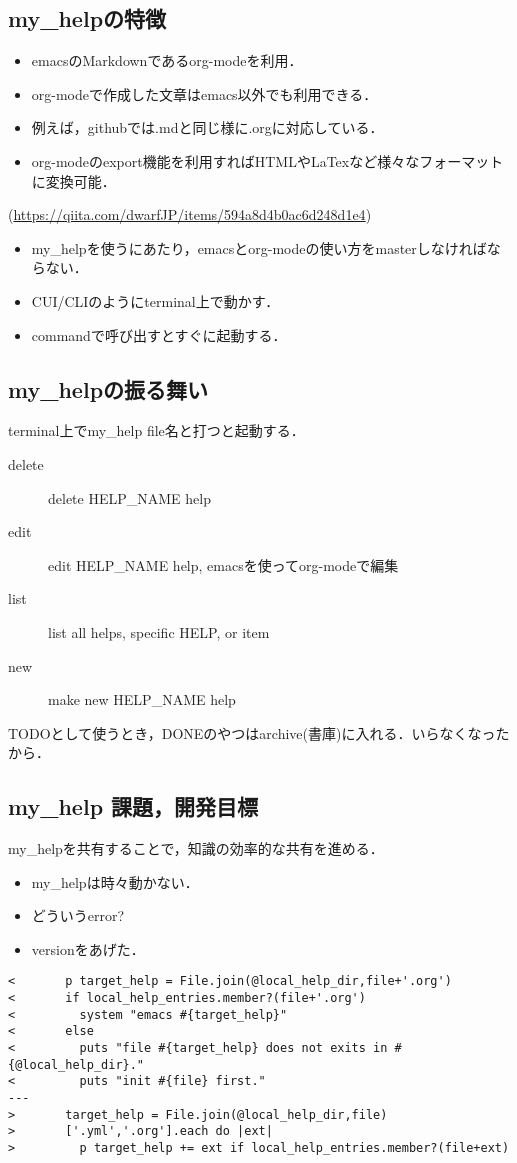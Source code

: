 \documentclass[a4j,twocolumn]{jsarticle}
\begin{document}
\subsection{my\_helpの特徴}
\label{sec-2-2}
\begin{itemize}
\item emacsのMarkdownであるorg-modeを利用．
\item org-modeで作成した文章はemacs以外でも利用できる．
\item 例えば，githubでは.mdと同じ様に.orgに対応している．
\item org-modeのexport機能を利用すればHTMLやLaTexなど様々なフォーマットに変換可能．
\end{itemize}
(\url{https://qiita.com/dwarfJP/items/594a8d4b0ac6d248d1e4})
\begin{itemize}
\item my\_helpを使うにあたり，emacsとorg-modeの使い方をmasterしなければならない．
\item CUI/CLIのようにterminal上で動かす．
\item commandで呼び出すとすぐに起動する．
\end{itemize}

\subsection{my\_helpの振る舞い}
\label{sec-2-3}
terminal上でmy\_help file名と打つと起動する．
\begin{description}
\item[{delete}] delete HELP\_NAME help
\item[{edit}] edit HELP\_NAME help, emacsを使ってorg-modeで編集
\item[{list}] list all helps, specific HELP, or item
\item[{new}] make new HELP\_NAME help
\end{description}

TODOとして使うとき，DONEのやつはarchive(書庫)に入れる．いらなくなったから．

\subsection{my\_help 課題，開発目標}
\label{sec-2-4}
my\_helpを共有することで，知識の効率的な共有を進める．

\begin{itemize}
\item my\_helpは時々動かない．
\item どういうerror?
\item versionをあげた．
\end{itemize}
\begin{verbatim}
<       p target_help = File.join(@local_help_dir,file+'.org')
<       if local_help_entries.member?(file+'.org')
<         system "emacs #{target_help}"
<       else
<         puts "file #{target_help} does not exits in #{@local_help_dir}."
<         puts "init #{file} first."
---
>       target_help = File.join(@local_help_dir,file)
>       ['.yml','.org'].each do |ext|
>         p target_help += ext if local_help_entries.member?(file+ext)
\end{verbatim}
\end{document}
